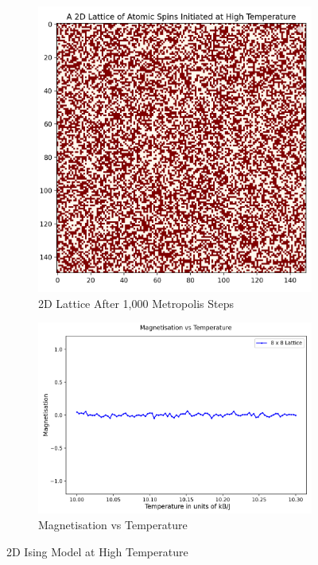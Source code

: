 \documentclass[a4paper]{article}
\begin{document}
\begin{figure}[h]
\centering
\begin{subfigure}{0.37\textwidth}
\includegraphics[width=1\linewidth]{2D Lattice High Temperature.png} 
\caption{2D Lattice After 1,000 Metropolis Steps}
\label{fig:subim1}
\end{subfigure}
\begin{subfigure}{0.5\textwidth}
\includegraphics[width=1.02\linewidth,left]{mag vs temp high temp.png}
\caption{Magnetisation vs Temperature}
\label{fig:subim2}
\end{subfigure}
\caption{2D Ising Model at High Temperature}
\label{fig:image2}
\end{figure}
\end{document}
